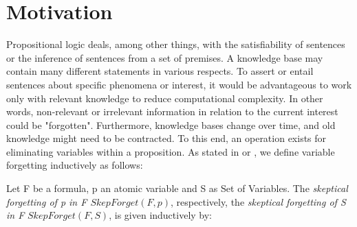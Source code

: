 \section{Motivation}
Propositional logic deals, among other things, with the satisfiability of sentences or the inference of sentences from a set of premises. 
                A knowledge base may contain many different statements in various respects. 
                To assert or entail sentences about specific phenomena or interest, it would be advantageous to work only with relevant knowledge to reduce computational complexity. 
                In other words, non-relevant or irrelevant information in relation to the current interest could be "forgotten". 
                Furthermore, knowledge bases change over time, and old knowledge might need to be contracted. 
                To this end, an operation exists for eliminating variables within a proposition. 
                As stated in \cite{lin1994forget} or \cite{lang2003propositional}, we define variable forgetting inductively as follows:\begin{definition}
Let F be a formula, p an atomic variable and S as Set of Variables. The \emph{skeptical forgetting of p in F $\mathit{SkepForget}(F,p)$}, respectively, the \emph{skeptical forgetting of S in F} $\mathit{SkepForget(F,S)}$, is given inductively by:
\end{definition}
 
